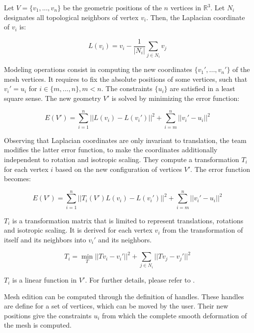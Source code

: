 Let $V = \{v_1, ..., v_n\}$ be the geometric positions of the $n$ vertices in $\mathbb{R}^3$. Let $N_i$ designates all topological neighbors of vertex $v_i$. Then, the Laplacian coordinate of $v_i$ is:

\begin{equation}
	L(v_i) = v_i - \frac{1}{|N_i|} \sum_{j \in N_i} v_j
\end{equation}

Modeling operations consist in computing the new coordinates $\{v_1',...,v_n'\}$ of the mesh vertices. It requires to fix the absolute positions of some vertices, such that $v_i' = u_i$ for $i \in \{m,...,n\}, m<n$. The constraints $\{u_i\}$ are satisfied in a least square sense. The new geometry $V'$ is solved by minimizing the error function: 

\begin{equation}
	E(V') = \sum_{i=1}^{n} || L(v_i) - L(v_i')||^2 + \sum_{i=m}^{n} || v_i' - u_i||^2
\end{equation}

Observing that Laplacian coordinates are only invariant to translation, the team modifies the latter error function, to make the coordinates additionally independent to rotation and isotropic scaling. They compute a transformation $T_i$ for each vertex $i$ based on the new configuration of vertices $V'$. The error function becomes: 

\begin{equation}
E(V') = \sum_{i=1}^{n} || T_i(V')L(v_i) - L(v_i')||^2 + \sum_{i=m}^{n} || v_i' - u_i||^2
\end{equation} 

$T_i$ is a transformation matrix that is limited to represent translations, rotations and isotropic scaling. It is derived for each vertex $v_i$ from the transformation of itself and its neighbors into $v_i'$ and its neighbors. 

\begin{equation}
	T_i = \min_{T} || Tv_i - v_i'||^2 + \sum_{j\in N_i} ||Tv_j-v_j'||^2
\end{equation}

$T_i$ is a linear function in $V'$. For further details, please refer to \cite{sorkine_2004_laplacian}.

Mesh edition can be computed through the definition of handles. These handles are define for a set of vertices, which can be moved by the user. Their new positions give the constraints $u_i$ from which the complete smooth deformation of the mesh is computed. 



